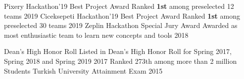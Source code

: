 \vspace{-3.2mm}



\begin{cvhonors}
  \cvhonor
    {Pixery Hackathon'19 Best Project Award} %
    {Ranked \textbf{1st} among preselected 12 teams} %
    {} %
    {2019} %
  \cvhonor
    {Ciceksepeti Hackathon'19 Best Project Award} %
    {Ranked \textbf{1st} among preselected 30 teams} %
    {} %
    {2019} %
  \cvhonor
    {Zeplin Hackathon Special Jury Award} %
    {Awarded as most enthusiastic team to learn new concepts and tools} %
    {} %
    {2018} %


  \cvhonor
    {Dean’s High Honor Roll } %
    {Listed in Dean's High Honor Roll for Spring 2017, Spring 2018 and Spring 2019} %
    {} %
    {2017} %
%
  \cvhonor
    {Ranked 273th among more than 2 million Students} %
    {Turkish University Attainment Exam} %
    {} %
    {2015} %
    \vspace{-5mm}


\begin{comment}
  \cvhonor
    {Ranked 1th among more than 1 million Students} %
    {Turkish High School Attainment Exam} %
    {} %
    {2011} %



  \cvhonor
    {Ranked in top 50} %
    {TUBITAK National Middle School Mathematic Olympiads} %
    {} %
    {2014} %


  \cvhonor
    {Vehbi Koc Scholar} %
    {Awarded for SPA over 3.50 /4.00 in Fall 2016, Spring 2017 and Fall 2017} %
    {} %
    {2017} %
\end{comment}
\end{cvhonors}



